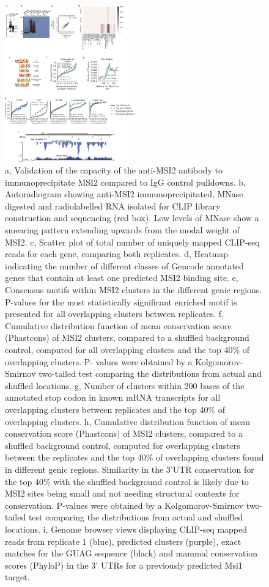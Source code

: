 \begin{figure}[ht]
  \centering
  \includegraphics[width=0.5\textwidth]{chapter_4_figures/Figure_S9}
  \caption[Supplementary Figure 3. MSI2 preferentially binds mature mRNA within the 3'UTR]{a, Validation of the capacity of the anti-MSI2 antibody to immunoprecipitate MSI2 compared to IgG control pulldowns. b, Autoradiogram showing anti-MSI2 immunoprecipitated, MNase digested and radiolabelled RNA isolated for CLIP library construction and sequencing (red box). Low levels of MNase show a smearing pattern extending upwards from the modal weight of MSI2. c, Scatter plot of total number of uniquely mapped CLIP-seq reads for each gene, comparing both replicates. d, Heatmap indicating the number of different classes of Gencode annotated genes that contain at least one predicted MSI2 binding site. e, Consensus motifs within MSI2 clusters in the different genic regions. P-values for the most statistically significant enriched motif is presented for all overlapping clusters between replicates. f, Cumulative distribution function of mean conservation score (Phastcons) of MSI2 clusters, compared to a shuffled background control, computed for all overlapping clusters and the top 40\% of overlapping clusters. P- values were obtained by a Kolgomorov-Smirnov two-tailed test comparing the distributions from actual and shuffled locations. g, Number of clusters within 200 bases of the annotated stop codon in known mRNA transcripts for all overlapping clusters between replicates and the top 40\% of overlapping clusters. h, Cumulative distribution function of mean conservation score (Phastcons) of MSI2 clusters, compared to a shuffled background control, computed for overlapping clusters between the replicates and the top 40\% of overlapping clusters found in different genic regions. Similarity in the 3'UTR conservation for the top 40\% with the shuffled background control is likely due to MSI2 sites being small and not needing structural contexts for conservation. P-values were obtained by a Kolgomorov-Smirnov two-tailed test comparing the distributions from actual and shuffled locations. i, Genome browser views displaying CLIP-seq mapped reads from replicate 1 (blue), predicted clusters (purple), exact matches for the GUAG sequence (black) and mammal conservation scores (PhyloP) in the 3' UTRs for a previously predicted Msi1 target. }
  \label{fig:Figure_S3}
\end{figure}

